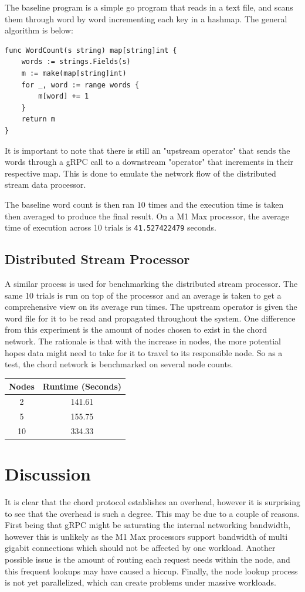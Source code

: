 \documentclass[journal]{IEEEtran}
\begin{document}
The baseline program is a simple go program that reads in a text file, and scans them through word by word incrementing each key in a hashmap. The general algorithm is below:

\begin{lstlisting}
func WordCount(s string) map[string]int {
	words := strings.Fields(s)
	m := make(map[string]int)
	for _, word := range words {
		m[word] += 1
	}
	return m
}
\end{lstlisting}

It is important to note that there is still an "upstream operator" that sends the words through a gRPC call to a downstream "operator" that increments in their respective map. This is done to emulate the network flow of the distributed stream data processor.

The baseline word count is then ran $10$ times and the execution time is taken then averaged to produce the final result. On a M1 Max processor, the average time of execution across 10 trials is \texttt{41.527422479} seconds.

\subsection{Distributed Stream Processor}
A similar process is used for benchmarking the distributed stream processor. The same 10 trials is run on top of the processor and an average is taken to get a comprehensive view on its average run times. The upstream operator is given the word file for it to be read and propagated throughout the system. One difference from this experiment is the amount of nodes chosen to exist in the chord network. The rationale is that with the increase in nodes, the more potential hopes data might need to take for it to travel to its responsible node. So as a test, the chord network is benchmarked on several node counts.
\begin{center}
\begin{tabular}{|c|c|} 
 \hline
 Nodes & Runtime (Seconds) \\ [0.5ex] 
 \hline
 2 & 141.61 \\ 
 \hline
 5 & 155.75 \\
 \hline
 10 & 334.33 \\
 \hline
\end{tabular}
\end{center}

\section{Discussion}
It is clear that the chord protocol establishes an overhead, however it is surprising to see that the overhead is such a degree. This may be due to a couple of reasons. First being that gRPC might be saturating the internal networking bandwidth, however this is unlikely as the M1 Max processors support bandwidth of multi gigabit connections which should not be affected by one workload. Another possible issue is the amount of routing each request needs within the node, and this frequent lookups may have caused a hiccup. Finally, the node lookup process is not yet parallelized, which can create problems under massive workloads.
\end{document}
